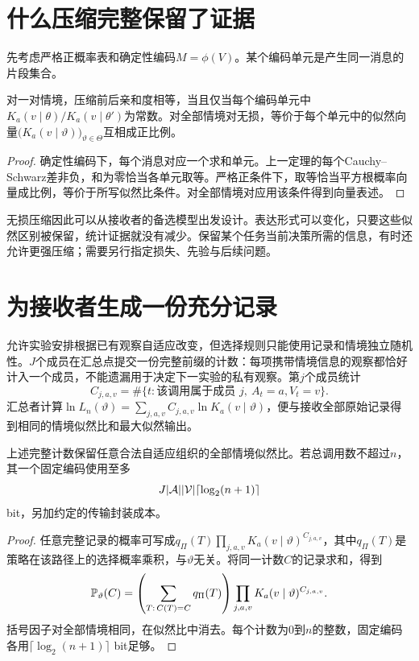 \section{什么压缩完整保留了证据}
先考虑严格正概率表和确定性编码$M=\phi(V)$。某个编码单元是产生同一消息的片段集合。

\begin{proposition}[亲和度无损压缩]
\label{prop:sufficiency}
对一对情境，压缩前后亲和度相等，当且仅当每个编码单元中$K_a(v\mid\theta)/K_a(v\mid\theta')$为常数。对全部情境对无损，等价于每个单元中的似然向量$\bigl(K_a(v\mid\vartheta)\bigr)_{\vartheta\in\Theta}$互相成正比例。
\end{proposition}
\begin{proof}
确定性编码下，每个消息对应一个求和单元。上一定理的每个Cauchy--Schwarz差非负，和为零恰当各单元取等。严格正条件下，取等恰当平方根概率向量成比例，等价于所写似然比条件。对全部情境对应用该条件得到向量表述。
\end{proof}

无损压缩因此可以从接收者的备选模型出发设计。表达形式可以变化，只要这些似然区别被保留，统计证据就没有减少。保留某个任务当前决策所需的信息，有时还允许更强压缩；需要另行指定损失、先验与后续问题。

\section{为接收者生成一份充分记录}
允许实验安排根据已有观察自适应改变，但选择规则只能使用记录和情境独立随机性。$J$个成员在汇总点提交一份完整前缀的计数：每项携带情境信息的观察都恰好计入一个成员，不能遗漏用于决定下一实验的私有观察。第$j$个成员统计
\[
 C_{j,a,v}=\#\{t:\text{该调用属于成员 }j,\ A_t=a,V_t=v\}.
\]
汇总者计算$\ln L_n(\vartheta)=\sum_{j,a,v}C_{j,a,v}\ln K_a(v\mid\vartheta)$，便与接收全部原始记录得到相同的情境似然比和最大似然输出。

\begin{proposition}[计数消息的精确组织实现]
\label{prop:counts}
上述完整计数保留任意合法自适应组织的全部情境似然比。若总调用数不超过$n$，其一个固定编码使用至多
\[
 J|\mathcal A||\mathcal V|\lceil\log_2(n+1)\rceil
\]
bit，另加约定的传输封装成本。
\end{proposition}
\begin{proof}
任意完整记录的概率可写成$q_\Pi(T)\prod_{j,a,v}K_a(v\mid\vartheta)^{C_{j,a,v}}$，其中$q_\Pi(T)$是策略在该路径上的选择概率乘积，与$\vartheta$无关。将同一计数$C$的记录求和，得到
\[
 \mathbb P_\vartheta(C)=\left(\sum_{T:\,C(T)=C}q_\Pi(T)\right)
       \prod_{j,a,v}K_a(v\mid\vartheta)^{C_{j,a,v}}.
\]
括号因子对全部情境相同，在似然比中消去。每个计数为$0$到$n$的整数，固定编码各用$\lceil\log_2(n+1)\rceil$ bit足够。
\end{proof}

